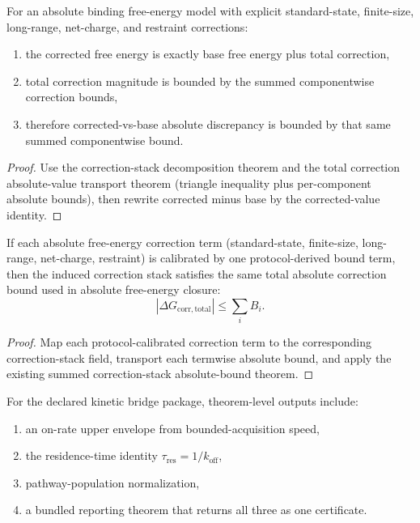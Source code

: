 \begin{theorem}\label{thm:absolute-binding-free-energy-closure}
For an absolute binding free-energy model with explicit standard-state, finite-size, long-range, net-charge, and restraint corrections:
\begin{enumerate}
\item the corrected free energy is exactly base free energy plus total correction,
\item total correction magnitude is bounded by the summed componentwise correction bounds,
\item therefore corrected-vs-base absolute discrepancy is bounded by that same summed componentwise bound.
\end{enumerate}
\end{theorem}

\begin{proof}
Use the correction-stack decomposition theorem and the total correction absolute-value transport theorem (triangle inequality plus per-component absolute bounds), then rewrite corrected minus base by the corrected-value identity.
\end{proof}

\begin{theorem}\label{thm:absolute-free-energy-protocol-derived-closure}
If each absolute free-energy correction term (standard-state, finite-size, long-range, net-charge, restraint) is calibrated by one protocol-derived bound term, then the induced correction stack satisfies the same total absolute correction bound used in absolute free-energy closure:
\[
\left|\Delta G_{\mathrm{corr,total}}\right| \le \sum_i B_i.
\]
\end{theorem}

\begin{proof}
Map each protocol-calibrated correction term to the corresponding correction-stack field, transport each termwise absolute bound, and apply the existing summed correction-stack absolute-bound theorem.
\end{proof}

\begin{theorem}\label{thm:kinetic-observable-reporting-endpoints}
For the declared kinetic bridge package, theorem-level outputs include:
\begin{enumerate}
\item an on-rate upper envelope from bounded-acquisition speed,
\item the residence-time identity $\tau_{\mathrm{res}}=1/k_{\mathrm{off}}$,
\item pathway-population normalization,
\item a bundled reporting theorem that returns all three as one certificate.
\end{enumerate}
\end{theorem}

